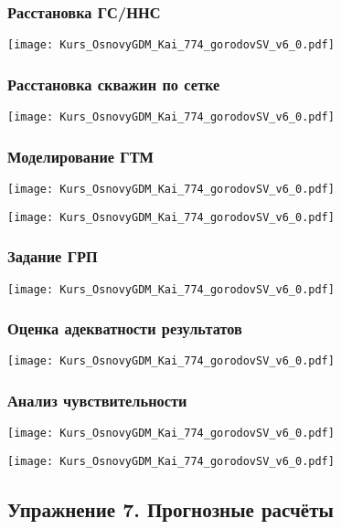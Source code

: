\documentclass[main.tex]{subfiles}
\begin{document}
\subsubsection{Расстановка ГС/ННС}

\texttt{[image: Kurs\_OsnovyGDM\_Kai\_774\_gorodovSV\_v6\_0.pdf]}

\subsubsection{Расстановка скважин по сетке}

\texttt{[image: Kurs\_OsnovyGDM\_Kai\_774\_gorodovSV\_v6\_0.pdf]}

\subsubsection{Моделирование ГТМ}

\texttt{[image: Kurs\_OsnovyGDM\_Kai\_774\_gorodovSV\_v6\_0.pdf]}

\texttt{[image: Kurs\_OsnovyGDM\_Kai\_774\_gorodovSV\_v6\_0.pdf]}

\subsubsection{Задание ГРП}

\texttt{[image: Kurs\_OsnovyGDM\_Kai\_774\_gorodovSV\_v6\_0.pdf]}

\subsubsection{Оценка адекватности результатов}

\texttt{[image: Kurs\_OsnovyGDM\_Kai\_774\_gorodovSV\_v6\_0.pdf]}

\subsubsection{Анализ чувствительности}

\texttt{[image: Kurs\_OsnovyGDM\_Kai\_774\_gorodovSV\_v6\_0.pdf]}

\texttt{[image: Kurs\_OsnovyGDM\_Kai\_774\_gorodovSV\_v6\_0.pdf]}

\subsection{Упражнение 7. Прогнозные расчёты}
\end{document}
